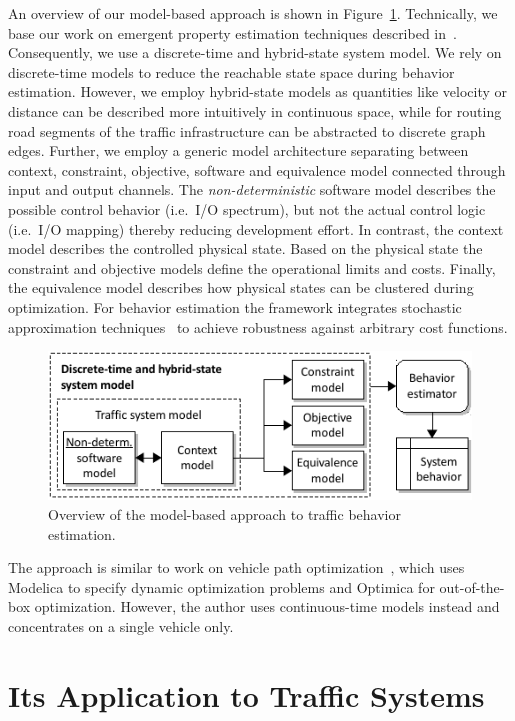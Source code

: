 \documentclass[conference]{../cls/IEEEtran}
\begin{document}
An overview of our model-based approach is shown in Figure~\ref{fig:framework}. Technically, we base our work on emergent property estimation techniques described in~\cite{Hackenberg2012}. Consequently, we use a discrete-time and hybrid-state system model. We rely on discrete-time models to reduce the reachable state space during behavior estimation. However, we employ hybrid-state models as quantities like velocity or distance can be described more intuitively in continuous space, while for routing road segments of the traffic infrastructure can be abstracted to discrete graph edges. Further, we employ a generic model architecture separating between context, constraint, objective, software and equivalence model connected through input and output channels. The \textit{non-deterministic} software model describes the possible control behavior (i.e.\ I/O spectrum), but not the actual control logic (i.e.\ I/O mapping) thereby reducing development effort. In contrast, the context model describes the controlled physical state. Based on the physical state the constraint and objective models define the operational limits and costs. Finally, the equivalence model describes how physical states can be clustered during optimization. For behavior estimation the framework integrates stochastic approximation techniques~\cite{Pereira1991} to achieve robustness against arbitrary cost functions.

\begin{figure}[h]
	\centering
	\includegraphics{../gfx/framework.pdf}
	\caption{Overview of the model-based approach to traffic behavior estimation.}
	\label{fig:framework}
\end{figure}

The approach is similar to work on vehicle path optimization~\cite{Danielsson2007}, which uses Modelica to specify dynamic optimization problems and Optimica for out-of-the-box optimization. However, the author uses continuous-time models instead and concentrates on a single vehicle only.

\section{Its Application to Traffic Systems}
\end{document}
